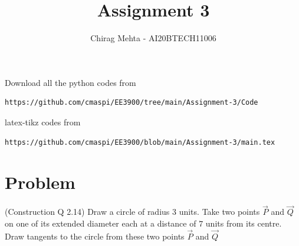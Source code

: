 \documentclass[journal,12pt,twocolumn]{IEEEtran}
\begin{document}
     \def\rightbox#1{\makebox[0in][r]{#1}}
     \def\centbox#1{\makebox[0in]{#1}}
     \def\topbox#1{\raisebox{-\baselineskip}[0in][0in]{#1}}
     \def\midbox#1{\raisebox{-0.5\baselineskip}[0in][0in]{#1}}
\vspace{3cm}
\title{Assignment 3}
\author{Chirag Mehta - AI20BTECH11006}
\maketitle
\newpage
\bigskip
\renewcommand{\thefigure}{\theenumi}
\renewcommand{\thetable}{\theenumi}
Download all the python codes from
\begin{lstlisting}
https://github.com/cmaspi/EE3900/tree/main/Assignment-3/Code
\end{lstlisting}
latex-tikz codes from 
\begin{lstlisting}
https://github.com/cmaspi/EE3900/blob/main/Assignment-3/main.tex
\end{lstlisting}
\section{Problem}
(Construction Q 2.14) Draw a circle of radius 3 units.
Take two points $\vec{P}$ and $\vec{Q}$ on one of its extended 
diameter each at a distance of $7$ units from its centre.
Draw tangents to the circle from these two points $\vec{P}$ and $\vec{Q}$ 
\end{document}
